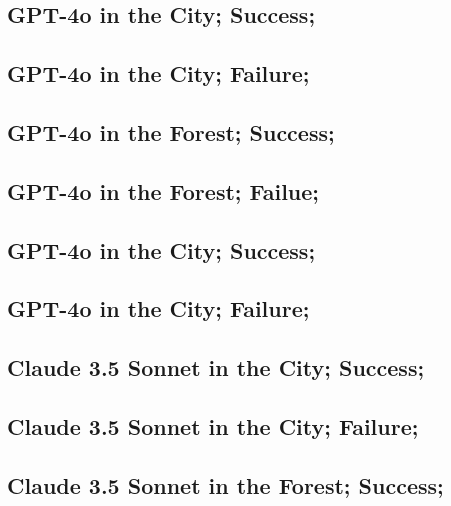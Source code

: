 \subsection{GPT-4o in the City; Success; \challenge{}}


\subsection{GPT-4o in the City; Failure; \challenge{}}


\subsection{GPT-4o in the Forest; Success; \challenge{}}


\subsection{GPT-4o in the Forest; Failue; \challenge{}}


\subsection{GPT-4o in the City; Success; \hardchallenge{}}


\subsection{GPT-4o in the City; Failure; \hardchallenge{}}


\subsection{Claude 3.5 Sonnet in the City; Success; \challenge{}}


\subsection{Claude 3.5 Sonnet in the City; Failure; \challenge{}}


\subsection{Claude 3.5 Sonnet in the Forest; Success; \challenge{}}


